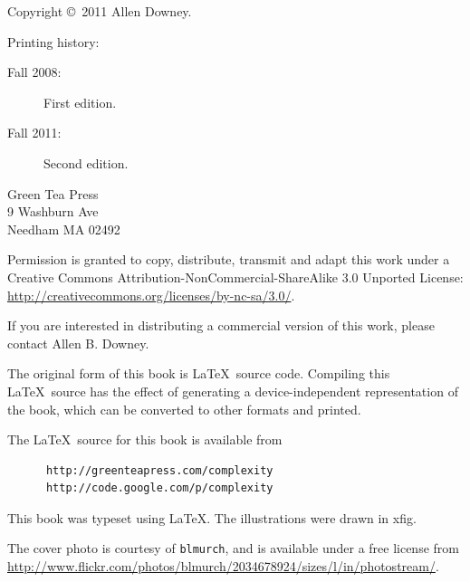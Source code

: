\documentclass[10pt]{book}
\begin{document}
\begin{latexonly}
\pagebreak
\thispagestyle{empty}

{\small
Copyright \copyright ~2011 Allen Downey.


Printing history:

\begin{description}

\item[Fall 2008:] First edition.

\item[Fall 2011:] Second edition.

\end{description}

\vspace{0.2in}

\begin{flushleft}
Green Tea Press       \\
9 Washburn Ave \\
Needham MA 02492
\end{flushleft}

Permission is granted to copy, distribute, transmit and adapt
this work under a Creative Commons
Attribution-NonCommercial-ShareAlike 3.0 Unported License:
\url{http://creativecommons.org/licenses/by-nc-sa/3.0/}.

If you are interested in distributing a commercial version of this
work, please contact Allen B. Downey.

The original form of this book is \LaTeX\ source code.  Compiling this
\LaTeX\ source has the effect of generating a device-independent
representation of the book, which can be converted to other formats
and printed.

The \LaTeX\ source for this book is available from

\begin{verbatim}
      http://greenteapress.com/complexity
      http://code.google.com/p/complexity
\end{verbatim}

This book was typeset using \LaTeX .  The illustrations were
drawn in xfig.

The cover photo is courtesy of {\tt blmurch}, and is available
under a free license from
\url{http://www.flickr.com/photos/blmurch/2034678924/sizes/l/in/photostream/}.

\vspace{0.2in}

} %

\end{latexonly}
\end{document}
